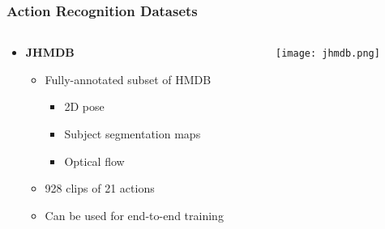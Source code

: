 \documentclass[9pt]{beamer}
\providecommand{\source}{\\ \footnotesize \tugreen{Source:} \footnotemark}
\newenvironment{myframe}[1][]{%
\begin{frame}%
\frametitle{#1}
\setcounter{footnote}{0}


}{%
\end{frame}%
}
\begin{document}
\begin{myframe}[Action Recognition Datasets]
  \begin{columns}[T]
      \begin{column}{.48\textwidth}
          \begin{itemize}
              \item \textbf{JHMDB\footnotemark}
              \begin{itemize}
                  \item Fully-annotated subset of HMDB
                  \begin{itemize}
                      \item 2D pose
                      \item Subject segmentation maps
                      \item Optical flow
                  \end{itemize}
                  \item 928 clips of 21 actions
                  \item Can be used for end-to-end training
              \end{itemize}
          \end{itemize}
      \end{column}
      \begin{column}{.48\textwidth}
          \begin{figure}
              \texttt{[image: jhmdb.png]}
              \centering
              \source
          \end{figure}
      \end{column}
  \end{columns}
\end{myframe}
\end{document}
